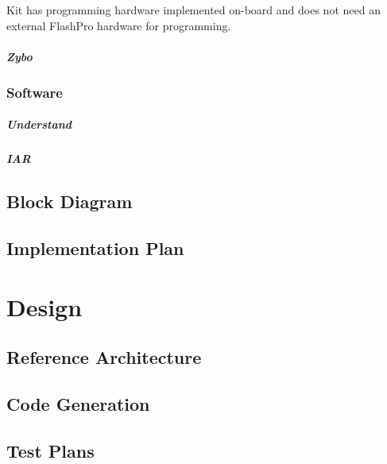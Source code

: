 \documentclass{report}
\begin{document}
			\par Kit has programming hardware implemented on-board and does not need an external FlashPro hardware for programming.
			
			\paragraph{Zybo}

		\subsection{Software}

			\paragraph{Understand}

			\paragraph{IAR}

	\section{Block Diagram}

	\section{Implementation Plan}


\chapter{Design}

	\section{Reference Architecture}
	
	\section{Code Generation}
	
	\section{Test Plans}
	
\end{document}
